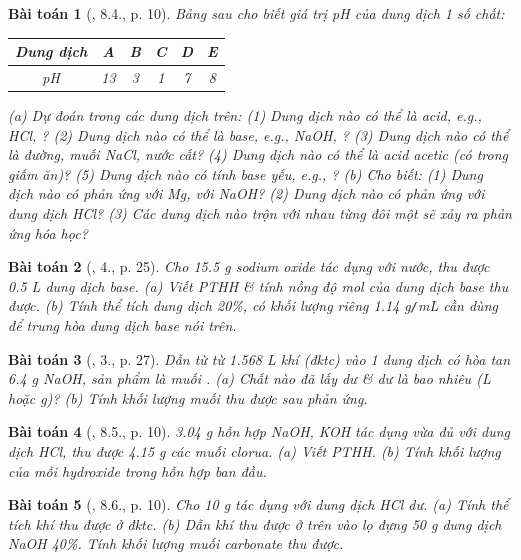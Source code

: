 \documentclass{article}
\newtheorem{baitoan}{Bài toán}
\begin{document}
\begin{baitoan}[\cite{SGK_Hoa_Hoc_9}, 8.4., p. 10]
	Bảng sau cho biết giá trị pH của dung dịch 1 số chất:
	\begin{table}[H]
		\centering
		\begin{tabular}{|c|c|c|c|c|c|}
			\hline
			Dung dịch & A & B & C & D & E \\
			\hline
			pH & 13 & 3 & 1 & 7 & 8 \\
			\hline
		\end{tabular}
	\end{table}
	\noindent(a) Dự đoán trong các dung dịch trên: (1) Dung dịch nào có thể là acid, e.g., {\rm HCl, }? (2) Dung dịch nào có thể là base, e.g., {\rm NaOH, }? (3) Dung dịch nào có thể là đường, muối {\rm NaCl}, nước cất? (4) Dung dịch nào có thể là acid acetic (có trong giấm ăn)? (5) Dung dịch nào có tính base yếu, e.g., {\rm{}}? (b) Cho biết: (1) Dung dịch nào có phản ứng với {\rm Mg}, với {\rm NaOH}? (2) Dung dịch nào có phản ứng với dung dịch {\rm HCl}? (3) Các dung dịch nào trộn với nhau từng đôi một sẽ xảy ra phản ứng hóa học?	
\end{baitoan}

\begin{baitoan}[\cite{SGK_Hoa_Hoc_9}, 4., p. 25]
	Cho {\rm15.5 g} sodium oxide {\rm{}} tác dụng với nước, thu được {\rm0.5 L} dung dịch base. (a) Viết PTHH \& tính nồng độ mol của dung dịch base thu được. (b) Tính thể tích dung dịch {\rm{} 20\%}, có khối lượng riêng {\rm1.14 g{\tt/}mL} cần dùng để trung hòa dung dịch base nói trên.
\end{baitoan}

\begin{baitoan}[\cite{SGK_Hoa_Hoc_9}, 3., p. 27]
	Dẫn từ từ {\rm1.568 L} khí {\rm{}} (đktc) vào 1 dung dịch có hòa tan {\rm6.4 g NaOH}, sản phẩm là muối {\rm{}}. (a) Chất nào đã lấy dư \& dư là bao nhiêu ({\rm L} hoặc {\rm g})? (b) Tính khối lượng muối thu được sau phản ứng.
\end{baitoan}

\begin{baitoan}[\cite{SGK_Hoa_Hoc_9}, 8.5., p. 10]
	{\rm3.04 g} hỗn hợp {\rm NaOH, KOH} tác dụng vừa đủ với dung dịch {\rm HCl}, thu được {\rm4.15 g} các muối clorua. (a) Viết {\rm PTHH}. (b) Tính khối lượng của mỗi hydroxide trong hỗn hợp ban đầu.
\end{baitoan}

\begin{baitoan}[\cite{SGK_Hoa_Hoc_9}, 8.6., p. 10]
	Cho {\rm10 g } tác dụng với dung dịch {\rm HCl} dư. (a) Tính thể tích khí {\rm{}} thu được ở đktc. (b) Dẫn khí {\rm{}} thu được ở trên vào lọ đựng {\rm50 g} dung dịch {\rm NaOH 40\%}. Tính khối lượng muối carbonate thu được.
\end{baitoan}
\end{document}

